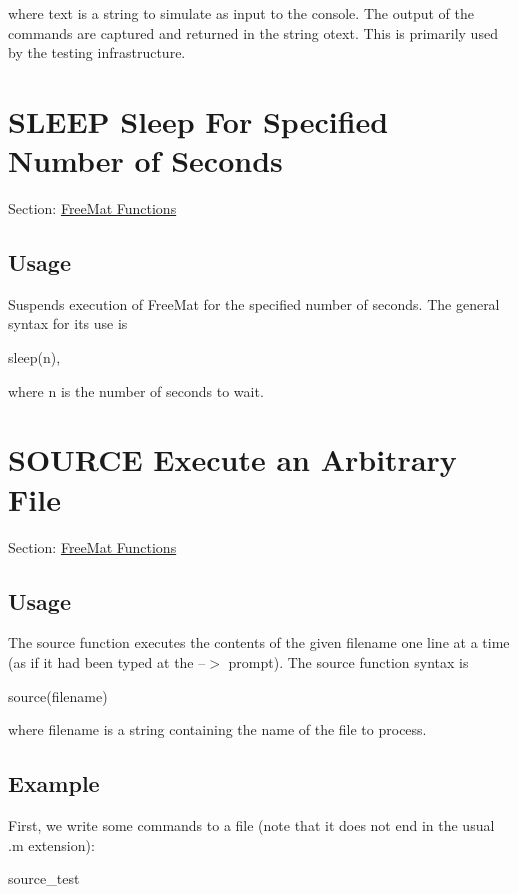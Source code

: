  where {\ttfamily text} is a string to simulate as input to the console. The output of the commands are captured and returned in the string {\ttfamily otext}. This is primarily used by the testing infrastructure. \hypertarget{freemat_sleep}{}\section{S\-L\-E\-E\-P Sleep For Specified Number of Seconds}\label{freemat_sleep}
Section\-: \hyperlink{sec_freemat}{Free\-Mat Functions} \hypertarget{vtkwidgets_vtkxyplotwidget_Usage}{}\subsection{Usage}\label{vtkwidgets_vtkxyplotwidget_Usage}
Suspends execution of Free\-Mat for the specified number of seconds. The general syntax for its use is \begin{DoxyVerb}  sleep(n),
\end{DoxyVerb}
 where {\ttfamily n} is the number of seconds to wait. \hypertarget{freemat_source}{}\section{S\-O\-U\-R\-C\-E Execute an Arbitrary File}\label{freemat_source}
Section\-: \hyperlink{sec_freemat}{Free\-Mat Functions} \hypertarget{vtkwidgets_vtkxyplotwidget_Usage}{}\subsection{Usage}\label{vtkwidgets_vtkxyplotwidget_Usage}
The {\ttfamily source} function executes the contents of the given filename one line at a time (as if it had been typed at the {\ttfamily --$>$} prompt). The {\ttfamily source} function syntax is \begin{DoxyVerb}  source(filename)
\end{DoxyVerb}
 where {\ttfamily filename} is a {\ttfamily string} containing the name of the file to process. \hypertarget{variables_struct_Example}{}\subsection{Example}\label{variables_struct_Example}
First, we write some commands to a file (note that it does not end in the usual {\ttfamily .m} extension)\-:

\begin{DoxyVerb}     source_test
\end{DoxyVerb}



